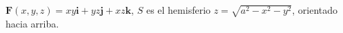 \item $\mathbf{F}(x, y, z) = xy \mathbf{i} + yz \mathbf{j} + xz \mathbf{k}$, $S$ es el hemisferio $z = \sqrt{a^2 - x^2 - y^2}$, orientado hacia arriba.
